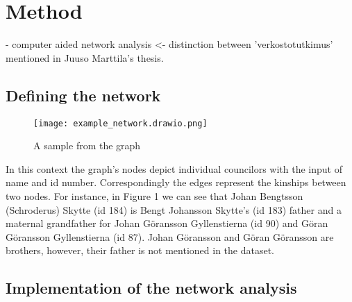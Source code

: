 \documentclass[a4paper,12pt]{article}
\begin{document}
\section{Method}
- computer aided network analysis <- distinction between 'verkostotutkimus' mentioned in Juuso Marttila's thesis.
\subsection{Defining the network}

\begin{figure}[h]
	\caption{A sample from the graph} 
	\centering
	\texttt{[image: example\_network.drawio.png]}
	\centering	
\end{figure}
In this context the graph's nodes depict individual councilors with the input of name and id number. Correspondingly the edges represent the kinships between two nodes. For instance, in Figure 1 we can see that Johan Bengtsson (Schroderus) Skytte (id 184) is Bengt Johansson Skytte's (id 183) father and a maternal grandfather for Johan Göransson Gyllenstierna (id 90) and Göran Göransson Gyllenstierna (id 87). Johan Göransson and Göran Göransson are brothers, however, their father is not mentioned in the dataset. 

\subsection{Implementation of the network analysis}
\end{document}
